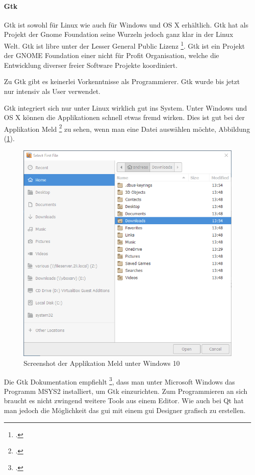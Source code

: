 \paragraph{Gtk}
\label{sec:orgbac0846}

Gtk ist sowohl für Linux wie auch für Windows und OS X erhältlich. Gtk hat als
Projekt der Gnome Foundation seine Wurzeln jedoch ganz klar in der Linux Welt.
Gtk ist \gls{libre} unter der Lesser General Public Lizenz \footcite{gtklicense}.
Gtk ist ein Projekt der GNOME Foundation einer nicht für Profit Organisation,
welche die Entwicklung diverser freier Software Projekte koordiniert.

Zu Gtk gibt es keinerlei Vorkenntnisse als Programmierer. Gtk wurde bis jetzt
nur intensiv als User verwendet.

Gtk integriert sich nur unter Linux wirklich gut ins System. Unter Windows und
OS X können die Applikationen schnell etwas fremd wirken. Dies ist gut bei der
Applikation Meld \footcite{meld} zu sehen, wenn man eine Datei auswählen möchte,
Abbildung (\ref{fig:org7ef2fd3}).

\begin{figure}[htbp]
\centering
\includegraphics[width=.9\linewidth]{pictures/meld.png}
\caption{\label{fig:org7ef2fd3}
Screenshot der Applikation Meld unter Windows 10}
\end{figure}
Die Gtk Dokumentation empfiehlt \footcite{gtk_setup}, dass man unter Microsoft
Windows das Programm MSYS2 installiert, um Gtk einzurichten. Zum Programmieren
an sich braucht es nicht zwingend weitere Tools aus einem Editor. Wie auch bei
Qt hat man jedoch die Möglichkeit das \gls{gui} mit einem \gls{gui} Designer
grafisch zu erstellen.

